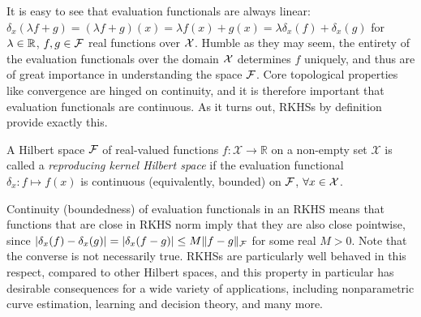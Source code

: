 It is easy to see that evaluation functionals are always linear: $\delta_x(\lambda f + g) = (\lambda f + g)(x) = \lambda f(x) + g(x) = \lambda\delta_x(f) + \delta_x(g)$ for $\lambda\in\mathbb{R}$, $f,g\in{\mathcal F}$ real functions over ${\mathcal X}$.
Humble as they may seem, the entirety of the evaluation functionals over the domain ${\mathcal X}$ determines $f$ uniquely, and thus are of great importance in understanding the space ${\mathcal F}$.
Core topological properties like convergence are hinged on continuity, and it is therefore important that evaluation functionals are continuous.
As it turns out, RKHSs by definition provide exactly this.

\begin{definition}\label{def:rkhs}
	A Hilbert space ${\mathcal F}$ of real-valued functions $f:\mathcal X \rightarrow \mathbb R$ on a non-empty set $\mathcal X$ is called a \emph{reproducing kernel Hilbert space} if the evaluation functional $\delta_x: f \mapsto f(x)$ is continuous (equivalently, bounded) on ${\mathcal F}$, $\forall x \in {\mathcal X}$. 
\end{definition}

Continuity (boundedness) of evaluation functionals in an RKHS means that functions that are close in RKHS norm imply that they are also close pointwise, since $\vert \delta_x(f) - \delta_x(g) \vert = \vert \delta_x(f-g) \vert \leq M\Vert f-g \Vert_{\mathcal F}$ for some real $M>0$.
Note that the converse is not necessarily true.
RKHSs are particularly well behaved in this respect, compared to other Hilbert spaces, and this property in particular has desirable consequences for a wide variety of applications, including nonparametric curve estimation, learning and decision theory, and many more.

